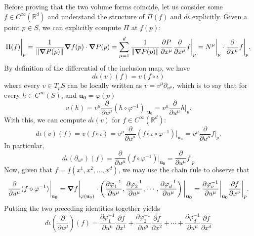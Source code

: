 \documentclass{article}
\newcommand{\p}{\partial}
\newcommand{\R}{\mathbb{R}}
\newcommand{\f}[2]{\frac{#1}{#2}}
\theoremstyle{theorem}
\begin{document}
Before proving that the two volume forms coincide, let us consider some $f\in C^\infty(\R^d)$ and understand the structure of $\Pi(f)$ and $d\iota$ explicitly. Given a point $p\in S$, we can explicitly compute $\Pi$ at $f(p)$: 
\begin{equation*}
\Pi(f)\bigg\vert_p = \f{1}{\norm{\grad P(p)}} \grad f(p) \cdot \grad P(p) 
= \sum^d_{\mu = 1} \f{1}{\norm{\grad P(p)}} \f{\p P}{\p x^\mu} \f{\p}{\p x^\mu} f \bigg\vert_{p} 
= N^\mu\bigg\vert_{p}\cdot \f{\p}{\p x^\mu}f\bigg\vert_{p}.
\end{equation*}
By definition of the differential of the inclusion map, we have
\begin{equation*}
d\iota(v)(f)=v(f\circ\iota)
\end{equation*}
where every $v\in T_pS$ can be locally written as 
$v =v^\mu \p_{u^\mu}$, which is to say that for every $h \in C^\infty(S)$, and $\mathbf{u_0} = \varphi(p)$
\begin{equation*}
    v(h) = v^\mu \f{\p}{\p u^\mu} (h\circ \varphi^{-1})\bigg\vert_{\mathbf{u_0}} = v^\mu \f{\p}{\p u^\mu} h\bigg\vert_{p}.
\end{equation*}
With this, we can compute $d\iota(v)$ for $f\in C^{\infty}(\R^d)$:
\begin{equation*}
d\iota(v)(f) =v(f\circ\iota)=v^{\mu}\frac{\partial}{\partial u^{\mu}}(f\circ\iota\circ\varphi^{-1})\bigg\vert_{\mathbf{u_0}}
=v^\mu\frac{\partial}{\partial u^{\mu}} f \bigg\vert_{p}.
\end{equation*}
In particular, 
\begin{equation*}
d\iota(\partial_{u^\mu})(f)=\frac{\partial}{\partial u^{\mu}}(f\circ\varphi^{-1})\bigg\vert_{\mathbf{u_0}} = \f{\p}{\p u^\mu} f \bigg\vert_{p}
\end{equation*}
Now, given that $f=f(x^1,x^2,\dots,x^d)$, we may use the chain rule to observe that
\begin{equation*}
\frac{\partial}{\partial u^{\mu}}
(f\circ\varphi^{-1})\bigg\vert_{\mathbf{u_0}}
=\grad f\bigg\vert_{\varphi(\mathbf{u}_0)}\cdot\left(\frac{\partial\varphi_1^{-1}}{\partial u^{\mu}},\frac{\partial\varphi_2^{-1}}{\partial u^{\mu}},\cdots,\frac{\partial\varphi_d^{-1}}{\partial u^{\mu}}\right)\bigg\vert_{\mathbf{u_0}}
= \f{\p \varphi_\nu^{-1}}{\p u^\mu}\bigg\vert_{\mathbf{u_0}} \f{\p f}{\p x^\nu}\bigg\vert_{p}.
\end{equation*}
Putting the two preceding identities together yields
\begin{equation*}
d\iota\left(\frac{\partial}{\partial u^\mu}\right)(f) =\frac{\partial\varphi_1^{-1}}{\partial u^{\mu}}\frac{\partial f}{\partial x^1}+\frac{\partial\varphi_2^{-1}}{\partial u^{\mu}}\frac{\partial f}{\partial x^2}+\cdots+\frac{\partial\varphi_d^{-1}}{\partial u^{\mu}}\frac{\partial f}{\partial x^d}
\end{equation*}
\end{document}
